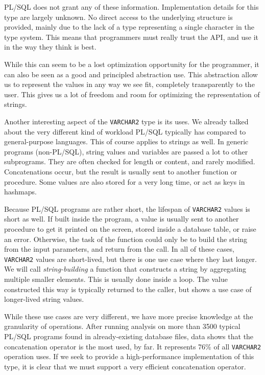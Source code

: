 \documentclass[twoside,11pt,a4paper]{article}
\newcommand{\pls}[1]{\small\texttt{#1}\normalsize}
\newcommand{\plstype}[1]{\pls{#1}}
\newcommand{\varchar}{\plstype{VARCHAR2}}
\begin{document}
PL/SQL does not grant any of these information. Implementation details for this type are largely unknown. No direct access to the underlying structure is provided, mainly due to the lack of a type representing a single character in the type system. This means that programmers must really trust the API, and use it in the way they think is best. 

While this can seem to be a lost optimization opportunity for the programmer, it can also be seen as a good and principled abstraction use. This abstraction allow us to represent the values in any way we see fit, completely transparently to the user. This gives us a lot of freedom and room for optimizing the representation of strings.

Another interesting aspect of the \varchar{} type is its uses. We already talked about the very different kind of workload PL/SQL typically has compared to general-purpose languages. This of course applies to strings as well. In generic programs (non-PL/SQL), string values and variables are passed a lot to other subprograms. They are often checked for length or content, and rarely modified. Concatenations occur, but the result is usually sent to another function or procedure. Some values are also stored for a very long time, or act as keys in hashmaps.

Because PL/SQL programs are rather short, the lifespan of \varchar{} values is short as well. If built inside the program, a value is usually sent to another procedure to get it printed on the screen, stored inside a database table, or raise an error. Otherwise, the task of the function could only be to build the string from the input parameters, and return from the call. In all of these cases, \varchar{} values are short-lived, but there is one use case where they last longer. We will call \textit{string-building} a function that constructs a string by aggregating multiple smaller elements. This is usually done inside a loop. The value constructed this way is typically returned to the caller, but shows a use case of longer-lived string values.


While these use cases are very different, we have more precise knowledge at the granularity of operations. After running analysis on more than 3500 typical PL/SQL programs found in already-existing database files, data shows that the concatenation operator is the most used, by far. It represents 76\% of all \varchar{} operation uses. If we seek to provide a high-performance implementation of this type, it is clear that we must support a very efficient concatenation operator.
\end{document}
